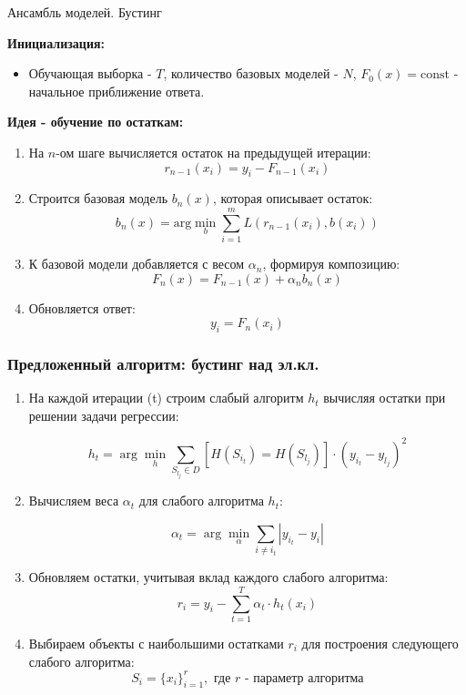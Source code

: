 \documentclass[10pt,pdf,unicode,aspectratio=169]{beamer}
\begin{document}
                


\begin{frame}[fragile]{Ансамбль моделей. Бустинг}

\textbf{Инициализация:}
\begin{itemize}
  \item Обучающая выборка - $T$, количество базовых моделей - $N$, $F_0(x) = \text{const}$ - начальное приближение ответа.
\end{itemize}

\textbf{Идея - обучение по остаткам:}
\begin{enumerate}
  \item На $n$-ом шаге вычисляется остаток на предыдущей итерации:
    \[
    r_{n-1}(x_i) = y_i - F_{n-1}(x_i)
    \]
  \item Строится базовая модель $b_n(x)$, которая описывает остаток:
    \[
    b_n(x) = \text{arg}\min_{b} \sum_{i=1}^{m} L(r_{n-1}(x_i), b(x_i))
    \]
   \item К базовой модели добавляется с весом $\alpha_n$, формируя композицию:
    \[
    F_n(x) = F_{n-1}(x) + \alpha_n b_n(x)
    \]
  \item Обновляется ответ:
    \[
    y_i = F_n(x_i)
    \]
\end{enumerate}


\end{frame}

\begin{frame}
\frametitle{Предложенный алгоритм: бустинг над эл.кл.}
\begin{enumerate}
    \item На каждой итерации (t) строим слабый алгоритм $h_t$ вычисляя остатки при решении задачи регрессии:

   \[h_t = \arg\min_h \sum_{S_{l_j} \in D} [H(S_{i_t})=H(S_{l_j})] \cdot (y_{i_t} - y_{l_j})^2\]
   \item Вычисляем веса \(\alpha_t\) для слабого алгоритма \(h_t\):

   \[\alpha_t = \arg\min_{\alpha} \sum_{i \neq i_t} \left| y_{i_t} - y_i \right|\]
   \item Обновляем остатки, учитывая вклад каждого слабого алгоритма:
   \[r_i = y_i - \sum_{t=1}^{T} \alpha_t \cdot h_t(x_i)\]
   \item Выбираем объекты с наибольшими остатками \(r_i\) для построения следующего слабого алгоритма:
   \[S_i = \{x_i\}_{i=1}^{r}, \text{ где } r \text{ - параметр алгоритма}\]

   
\end{enumerate}
\end{frame}
\end{document}

